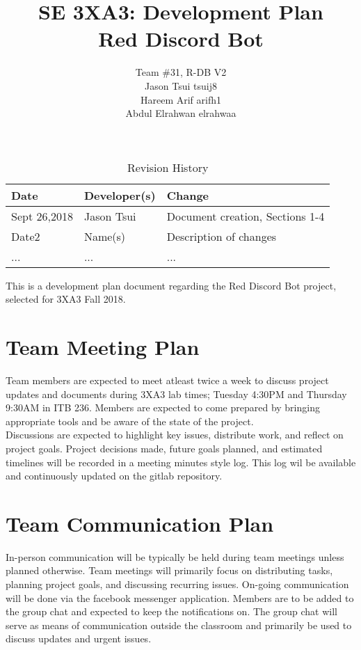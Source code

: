 \documentclass[12pt]{article}
\title{SE 3XA3: Development Plan\\Red Discord Bot}
\author{Team \#31, R-DB V2
		\\ Jason Tsui tsuij8
		\\ Hareem Arif arifh1
		\\ Abdul Elrahwan elrahwaa
}
\date{}
\begin{document}
\begin{table}[hp]
\caption{Revision History} \label{TblRevisionHistory}
\begin{tabularx}{\textwidth}{llX}
\toprule
\textbf{Date} & \textbf{Developer(s)} & \textbf{Change}\\
\midrule
Sept 26,2018 & Jason Tsui & Document creation, Sections 1-4\\
Date2 & Name(s) & Description of changes\\
... & ... & ...\\
\bottomrule
\end{tabularx}
\end{table}




\newpage

\maketitle
This is a development plan document regarding the Red Discord Bot project, selected for 3XA3 Fall 2018.

\section{Team Meeting Plan}
\tab Team members are expected to meet atleast twice a week to discuss project updates and documents during 3XA3 lab times; Tuesday 4:30PM and Thursday 9:30AM in ITB 236. Members are expected to come prepared by bringing appropriate tools and be aware of the state of the project.\\

Discussions are expected to highlight key issues, distribute work, and reflect on project goals. Project decisions made, future goals planned, and estimated timelines will be recorded in a meeting minutes style log. This log wil be available and continuously updated on the gitlab repository.




\section{Team Communication Plan}

\tab In-person communication will be typically be held during team meetings unless planned otherwise. Team meetings will primarily focus on distributing tasks, planning project goals, and discussing recurring issues. On-going communication will be done via the facebook messenger application. Members are to be added to the group chat and expected to keep the notifications on. The group chat will serve as means of communication outside the classroom and primarily be used to discuss updates and urgent issues.
\end{document}
